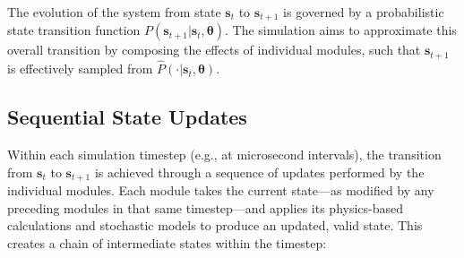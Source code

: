 \documentclass[5p,times,procedia]{elsarticle}
\begin{document}


The evolution of the system from state $\mathbf{s}_t$ to $\mathbf{s}_{t+1}$ is governed by a probabilistic state transition function $P(\mathbf{s}_{t+1}|\mathbf{s}_t, \boldsymbol{\theta})$. The simulation aims to approximate this overall transition by composing the effects of individual modules, such that $\mathbf{s}_{t+1}$ is effectively sampled from $\hat{P}(\cdot|\mathbf{s}_t, \boldsymbol{\theta})$.

\subsection{Sequential State Updates}

Within each simulation timestep (e.g., at microsecond intervals), the transition from $\mathbf{s}_t$ to $\mathbf{s}_{t+1}$ is achieved through a sequence of updates performed by the individual modules. Each module takes the current state—as modified by any preceding modules in that same timestep—and applies its physics-based calculations and stochastic models to produce an updated, valid state. This creates a chain of intermediate states within the timestep:
\end{document}
